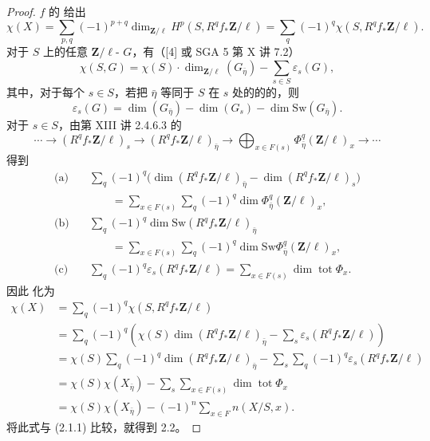 \begin{proof}
$f$ 的 给出
\[
\chi(X)=\sum_{p,q}(-1)^{p+q}\dim_{\mathbf Z/\ell}H^p(S,R^qf_*\mathbf Z/\ell)
=\sum_q(-1)^q\chi(S,R^qf_*\mathbf Z/\ell).
\]
对于 $S$ 上的任意 $\mathbf Z/\ell$- $G$，有（[4] 或 SGA 5 第 X 讲 7.2）
\[
\chi(S,G)=\chi(S)\cdot\dim_{\mathbf Z/\ell}(G_{\bar\eta})-\sum_{s\in S}\varepsilon_s(G),
\]
其中，对于每个 $s\in S$，若把 $\bar\eta$ 等同于 $S$ 在 $s$ 处的的的，则
\[
\varepsilon_s(G)=\dim(G_{\bar\eta})-\dim(G_s)-\dim\mathrm{Sw}(G_{\bar\eta}).
\]
对于 $s\in S$，由第 XIII 讲 2.4.6.3 的
\[
\cdots\longrightarrow(R^qf_*\mathbf Z/\ell)_s
\longrightarrow(R^qf_*\mathbf Z/\ell)_{\bar\eta}
\longrightarrow\bigoplus_{x\in F(s)}\Phi^q_{\bar\eta}(\mathbf Z/\ell)_x
\longrightarrow\cdots
\]
得到
\[
\begin{aligned}
\text{(a)}\quad&\sum_q(-1)^q\bigl(\dim(R^qf_*\mathbf Z/\ell)_{\bar\eta}-\dim(R^qf_*\mathbf Z/\ell)_s\bigr)\\
&\hspace{2em}=\sum_{x\in F(s)}\sum_q(-1)^q\dim\Phi^q_{\bar\eta}(\mathbf Z/\ell)_x,\\[4pt]
\text{(b)}\quad&\sum_q(-1)^q\dim\mathrm{Sw}(R^qf_*\mathbf Z/\ell)_{\bar\eta}\\
&\hspace{2em}=\sum_{x\in F(s)}\sum_q(-1)^q\dim\mathrm{Sw}\Phi^q_{\bar\eta}(\mathbf Z/\ell)_x,\\[4pt]
\text{(c)}\quad&\sum_q(-1)^q\varepsilon_s(R^qf_*\mathbf Z/\ell)
=\sum_{x\in F(s)}\dim\operatorname{tot}\Phi_x.
\end{aligned}
\]
因此 化为
\[
\begin{aligned}
\chi(X)
&=\sum_q(-1)^q\chi(S,R^qf_*\mathbf Z/\ell)\\
&=\sum_q(-1)^q\left(\chi(S)\dim(R^qf_*\mathbf Z/\ell)_{\bar\eta}
-\sum_s\varepsilon_s(R^qf_*\mathbf Z/\ell)\right)\\
&=\chi(S)\sum_q(-1)^q\dim(R^qf_*\mathbf Z/\ell)_{\bar\eta}
-\sum_s\sum_q(-1)^q\varepsilon_s(R^qf_*\mathbf Z/\ell)\\
&=\chi(S)\chi(X_{\bar\eta})-\sum_s\sum_{x\in F(s)}\dim\operatorname{tot}\Phi_x\\
&=\chi(S)\chi(X_{\bar\eta})-(-1)^n\sum_{x\in F}n(X/S,x).
\end{aligned}
\]
将此式与 (2.1.1) 比较，就得到 2.2。
\end{proof}

